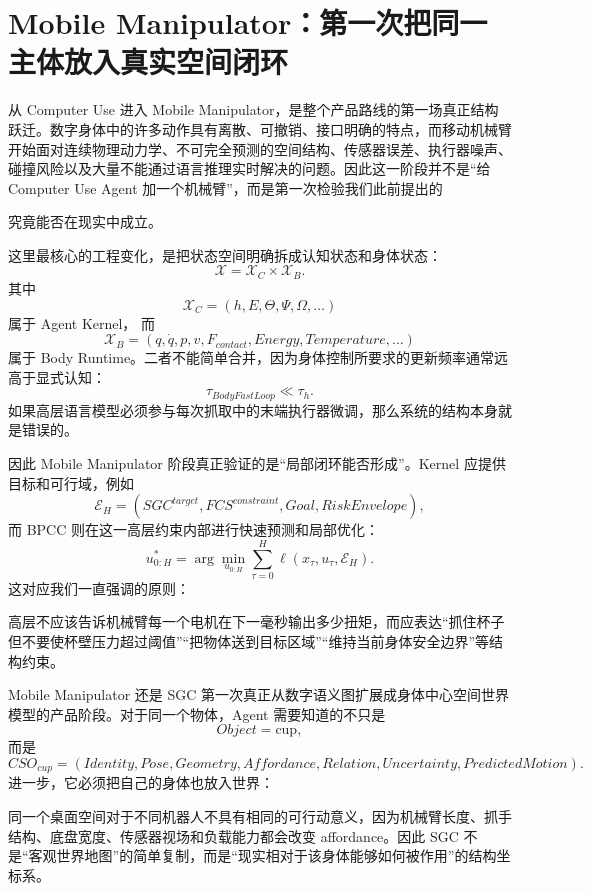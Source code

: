 \section{Mobile Manipulator：第一次把同一主体放入真实空间闭环}

从 Computer Use 进入 Mobile Manipulator，是整个产品路线的第一场真正结构跃迁。数字身体中的许多动作具有离散、可撤销、接口明确的特点，而移动机械臂开始面对连续物理动力学、不可完全预测的空间结构、传感器误差、执行器噪声、碰撞风险以及大量不能通过语言推理实时解决的问题。因此这一阶段并不是“给 Computer Use Agent 加一个机械臂”，而是第一次检验我们此前提出的
\begin{statementbox}
\centering
{}
\end{statementbox}
究竟能否在现实中成立。

这里最核心的工程变化，是把状态空间明确拆成认知状态和身体状态：
\[
\mathcal{X}
=
\mathcal{X}_C
\times
\mathcal{X}_B.
\]
其中
\[
\mathcal{X}_C
=
(h,E,\Theta,\Psi,\Omega,\ldots)
\]
属于 Agent Kernel，
而
\[
\mathcal{X}_B
=
(q,\dot q,p,v,F_{contact},Energy,Temperature,\ldots)
\]
属于 Body Runtime。二者不能简单合并，因为身体控制所要求的更新频率通常远高于显式认知：
\[
\tau_{BodyFastLoop}
\ll
\tau_h.
\]
如果高层语言模型必须参与每次抓取中的末端执行器微调，那么系统的结构本身就是错误的。

因此 Mobile Manipulator 阶段真正验证的是“局部闭环能否形成”。Kernel 应提供目标和可行域，例如
\[
\mathcal{E}_H
=
(
SGC^{target},
FCS^{constraint},
Goal,
RiskEnvelope
),
\]
而 BPCC 则在这一高层约束内部进行快速预测和局部优化：
\[
u_{0:H}^{*}
=
\arg\min_{u_{0:H}}
\sum_{\tau=0}^{H}
\ell(
x_{\tau},
u_{\tau},
\mathcal{E}_H
).
\]
这对应我们一直强调的原则：
\begin{statementbox}
\centering
{}
\end{statementbox}
高层不应该告诉机械臂每一个电机在下一毫秒输出多少扭矩，而应表达“抓住杯子但不要使杯壁压力超过阈值”“把物体送到目标区域”“维持当前身体安全边界”等结构约束。

Mobile Manipulator 还是 SGC 第一次真正从数字语义图扩展成身体中心空间世界模型的产品阶段。对于同一个物体，Agent 需要知道的不只是
\[
Object=\text{cup},
\]
而是
\[
CSO_{cup}
=
(
Identity,
Pose,
Geometry,
Affordance,
Relation,
Uncertainty,
PredictedMotion
).
\]
进一步，它必须把自己的身体也放入世界：
\begin{statementbox}
\centering
{}
\end{statementbox}
同一个桌面空间对于不同机器人不具有相同的可行动意义，因为机械臂长度、抓手结构、底盘宽度、传感器视场和负载能力都会改变 affordance。因此 SGC 不是“客观世界地图”的简单复制，而是“现实相对于该身体能够如何被作用”的结构坐标系。

